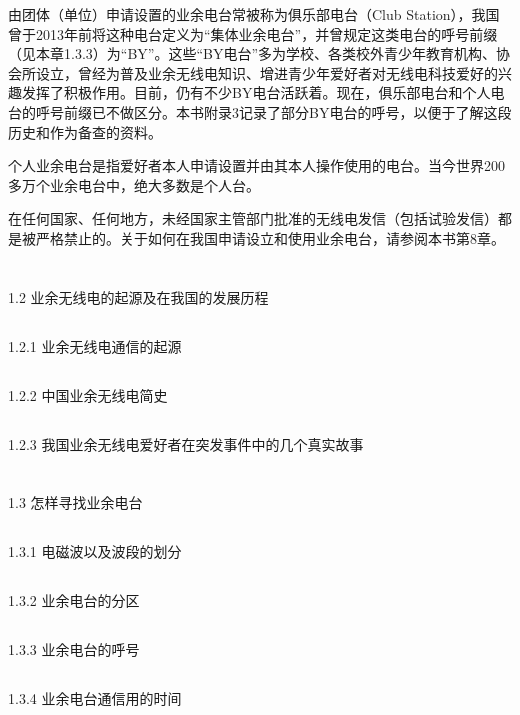 \documentclass[12pt,UTF8]{ctexbook}
\begin{document}
由团体（单位）申请设置的业余电台常被称为俱乐部电台（Club Station），我国曾于2013年前将这种电台定义为“集体业余电台”，并曾规定这类电台的呼号前缀（见本章1.3.3）为“BY”。这些“BY电台”多为学校、各类校外青少年教育机构、协会所设立，曾经为普及业余无线电知识、增进青少年爱好者对无线电科技爱好的兴趣发挥了积极作用。目前，仍有不少BY电台活跃着。现在，俱乐部电台和个人电台的呼号前缀已不做区分。本书附录3记录了部分BY电台的呼号，以便于了解这段历史和作为备查的资料。

个人业余电台是指爱好者本人申请设置并由其本人操作使用的电台。当今世界200多万个业余电台中，绝大多数是个人台。

在任何国家、任何地方，未经国家主管部门批准的无线电发信（包括试验发信）都是被严格禁止的。关于如何在我国申请设立和使用业余电台，请参阅本书第8章。

\section{}1.2 业余无线电的起源及在我国的发展历程
\subsection{}1.2.1 业余无线电通信的起源
\subsection{}1.2.2 中国业余无线电简史
\subsection{}1.2.3 我国业余无线电爱好者在突发事件中的几个真实故事
\section{}1.3 怎样寻找业余电台
\subsection{}1.3.1 电磁波以及波段的划分
\subsection{}1.3.2 业余电台的分区
\subsection{}1.3.3 业余电台的呼号
\subsection{}1.3.4 业余电台通信用的时间
\end{document}

